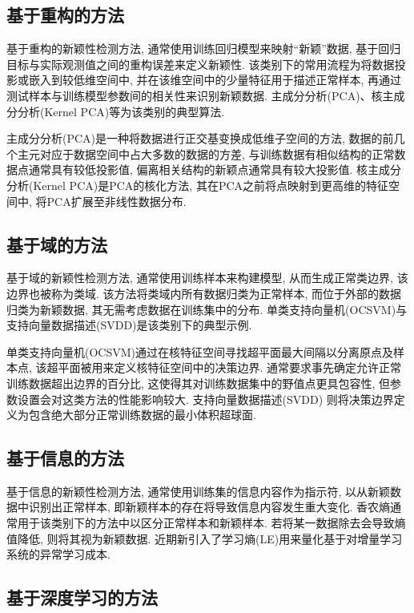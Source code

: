 \documentclass{Style/aas}
\begin{document}
\begin{multicols}{2}
  \subsection{基于重构的方法}
  基于重构的新颖性检测方法, 通常使用训练回归模型来映射“新颖”数据, 基于回归目标与实际观测值之间的重构误差来定义新颖性. 该类别下的常用流程为将数据投影或嵌入到较低维空间中, 并在该维空间中的少量特征用于描述正常样本, 再通过测试样本与训练模型参数间的相关性来识别新颖数据. 主成分分析(PCA)\cite{wold1987principal}、核主成分分析(Kernel PCA)\cite{scholkopf1997kernel}等为该类别的典型算法.

  主成分分析(PCA)是一种将数据进行正交基变换成低维子空间的方法, 数据的前几个主元对应于数据空间中占大多数的数据的方差, 与训练数据有相似结构的正常数据点通常具有较低投影值, 偏离相关结构的新颖点通常具有较大投影值. 核主成分分析(Kernel PCA)是PCA的核化方法, 其在PCA之前将点映射到更高维的特征空间中, 将PCA扩展至非线性数据分布.


  \subsection{基于域的方法}
  基于域的新颖性检测方法, 通常使用训练样本来构建模型, 从而生成正常类边界, 该边界也被称为类域. 该方法将类域内所有数据归类为正常样本, 而位于外部的数据归类为新颖数据, 其无需考虑数据在训练集中的分布. 单类支持向量机(OCSVM)\cite{heller2003one}与支持向量数据描述(SVDD)\cite{tax2004support}是该类别下的典型示例.

  单类支持向量机(OCSVM)通过在核特征空间寻找超平面最大间隔以分离原点及样本点, 该超平面被用来定义核特征空间中的决策边界. 通常要求事先确定允许正常训练数据超出边界的百分比, 这使得其对训练数据集中的野值点更具包容性, 但参数设置会对这类方法的性能影响较大. 支持向量数据描述(SVDD) 则将决策边界定义为包含绝大部分正常训练数据的最小体积超球面.

  \subsection{基于信息的方法}
  基于信息的新颖性检测方法, 通常使用训练集的信息内容作为指示符, 以从新颖数据中识别出正常样本, 即新颖样本的存在将导致信息内容发生重大变化. 香农熵\cite{dohnal2020novelty}通常用于该类别下的方法中以区分正常样本和新颖样本. 若将某一数据除去会导致熵值降低, 则将其视为新颖数据. 近期新引入了学习熵(LE)\cite{dohnal2020novelty}用来量化基于对增量学习系统的异常学习成本.

  \subsection{基于深度学习的方法}


\end{multicols}
\end{document}
